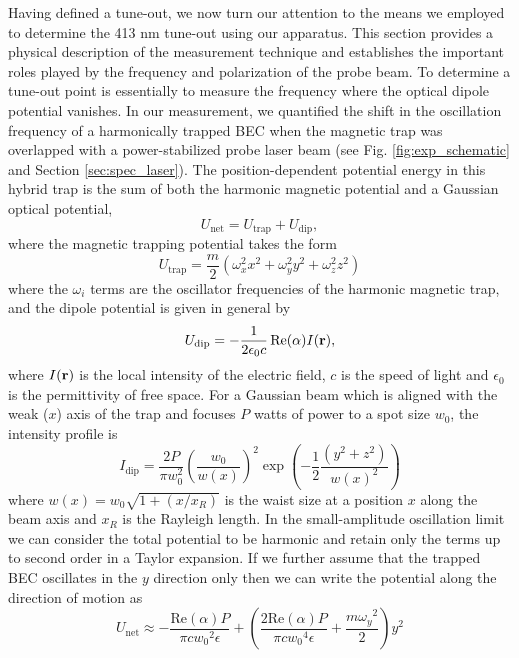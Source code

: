 	Having defined a tune-out, we now turn our attention to the means we employed to determine the 413 nm tune-out using our apparatus. 
	This section provides a physical description of the measurement technique and establishes the important roles played by the frequency and polarization of the probe beam.
	To determine a tune-out point is essentially to measure the frequency where the optical dipole potential  vanishes.
	In our measurement, we quantified the shift in the oscillation frequency of a harmonically trapped BEC when the magnetic trap was overlapped with a power-stabilized probe laser beam (see Fig. \ref{fig:exp_schematic} and Section \ref{sec:spec_laser}). 
	The position-dependent potential energy in this hybrid trap is the sum of both the harmonic magnetic potential and a Gaussian optical potential,
	\begin{equation}
		U_\mathrm{net} = U_{\mathrm{trap}} + U_\mathrm{dip},
	\end{equation}
	where the magnetic trapping potential takes the form
	\begin{equation}
		U_\mathrm{trap} = \frac{m}{2}\left(\omega_{x}^{2}x^2+\omega_{y}^{2}y^2+\omega_{z}^{2}z^2 \right)
	\end{equation}
	where the $\omega_i$ terms are the oscillator frequencies of the harmonic magnetic trap, and the dipole potential is given in general by  \cite{Grimm00}
	\begin{align}
	    U_{\mathrm{dip}}=-\frac{1}{2 \epsilon_{0} c} \operatorname{Re}(\alpha) I(\textbf{r}),
	\end{align}
	where $I(\textbf{r})$ is the local intensity of the electric field, $c$ is the speed of light and $\epsilon_0$ is the permittivity of free space.
	For a Gaussian beam which is aligned with the weak ($x$) axis of the trap and focuses $P$ watts of power to a spot size $w_0$, the intensity profile is 
	\begin{equation}
	    I_{\mathrm{dip}} =
	        \frac{2 P}{\pi w_0^2} \left(\frac{w_0}{w(x)}\right)^2 \exp\left( -\frac{1}{2} \frac{(y^2+z^2)}{w(x)^2} \right)
	 \end{equation}
	 where $w(x) = w_0\sqrt{1+(x/x_R)}$ is the waist size at a position $x$ along the beam axis and $x_R$ is the Rayleigh length. 
	 In the small-amplitude oscillation limit we can consider the total potential to be harmonic and retain only the terms up to second order in a Taylor expansion. If we further assume that the trapped BEC oscillates in the $y$ direction only then we can write the potential along the direction of motion as
	 \begin{equation}
	 U_\mathrm{net} \approx -\frac{\mathrm{Re}(\alpha)  P}{\pi 
   c {w_0}^2 \epsilon} + \left(\frac{2 \mathrm{Re}(\alpha)  P}{\pi  c {w_0}^4 \epsilon }+\frac{m {\omega_y}^2}{2}\right) y^2
	 \end{equation}

